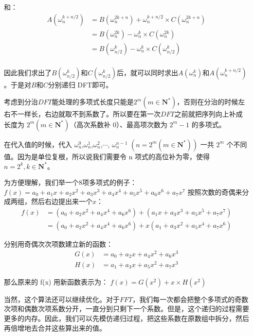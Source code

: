 \documentclass{article}
\begin{document}
和： 
\begin{equation*}
\begin{split}
A(\omega_n^{k+n/2}) &= B(\omega_n^{2k+n}) + \omega_n^{k+n/2}                        \times C(\omega_n^{2k+n}) \\
                    &= B(\omega_n^{2k}) - \omega_n^k  \times C(\omega_n^{2k}) \\
                    &= B(\omega_{n/2}^k) - \omega_n^k  \times C(\omega_{n/2}^k) \\
\end{split}
\end{equation*}

因此我们求出了$B(\omega_{n/2}^k)$和$C(\omega_{n/2}^k)$后，就可以同时求出$A(\omega_n^k)$和$A(\omega_n^{k+n/2})$。于是对$B$和$C$分别递归 DFT即可。

考虑到分治$DFT$能处理的多项式长度只能是$2^m(m \in \mathbf{N}^ \ast )$，否则在分治的时候左右不一样长，右边就取不到系数了。所以要在第一次$DFT$之前就把序列向上补成长度为 $2^m(m \in \mathbf{N}^\ast )$（高次系数补 0）、最高项次数为 $2^m-1$ 的多项式。

在代入值的时候，代入 
$\omega_n^0$,$\omega_n^1$,$\omega_n^2$,$\cdots$, $\omega_n^{n-1}$ $(n=2^m(m \in \mathbf{N}^ \ast ))$ 一共 $2^m$ 个不同值。因为是单位复根，所以说我们需要令 n 项式的高位补为零，使得 $n = 2 ^ k, k \in \mathbf{N}^ \ast$。

为方便理解，我们举一个8项多项式的例子：
$f(x) = a_0 + a_1x + a_2x^2+a_3x^3+a_4x^4+a_5x^5+a_6x^6+a_7x^7$
按照次数的奇偶来分成两组，然后右边提出来一个$x$：
\begin{equation*}
    \begin{split}
        f(x) &= (a_0+a_2x^2+a_4x^4+a_6x^6) + (a_1x+a_3x^3+a_5x^5+a_7x^7)\\
             &= (a_0+a_2x^2+a_4x^4+a_6x^6) + x(a_1+a_3x^2+a_5x^4+a_7x^6)
    \end{split}
\end{equation*}

分别用奇偶次次项数建立新的函数：
\begin{equation*}
    \begin{split}
        G(x) &= a_0+a_2x+a_4x^2+a_6x^3\\
        H(x) &= a_1+a_3x+a_5x^2+a_7x^3
    \end{split}
\end{equation*}

那么原来的 f(x) 用新函数表示为：
$f(x)=G\left(x^2\right) + x  \times  H\left(x^2\right)$

当然，这个算法还可以继续优化。对于$FFT$，我们每一次都会把整个多项式的奇数次项和偶数次项系数分开，一直分到只剩下一个系数。但是，这个递归的过程需要更多的内存。因此，我们可以先模仿递归过程，把这些系数在原数组中拆分，然后再倍增地去合并这些算出来的值。
\end{document}
